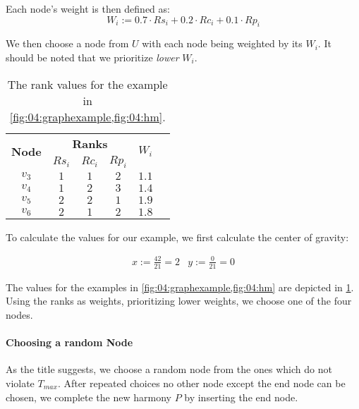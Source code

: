 Each node's weight is then defined as:
\begin{equation*}
	W_i := 0.7 \cdot Rs_i + 0.2 \cdot Rc_i + 0.1 \cdot Rp_i
\end{equation*}

We then choose a node from $U$ with each node being weighted by its $W_i$.
It should be noted that we prioritize \emph{lower} $W_i$.


\begin{table}
	\centering
	\begin{tabular}[c]{|c|c|c|c|c|c|}
		\hline
		\multirow{2}{*}{\textbf{Node}} & \multicolumn{3}{c|}{\textbf{Ranks}} & \multirow{2}{*}{$W_i$}                  \\
		                               & $Rs_i$                              & $Rc_i$                 & $Rp_i$ &       \\\hline
		$v_3$                          & $1$                                 & $1$                    & $2$    & $1.1$ \\\hline
		$v_4$                          & $1$                                 & $2$                    & $3$    & $1.4$ \\\hline
		$v_5$                          & $2$                                 & $2$                    & $1$    & $1.9$ \\\hline
		$v_6$                          & $2$                                 & $1$                    & $2$    & $1.8$ \\\hline
	\end{tabular}
	\caption{The rank values for the example in \cref{fig:04:graphexample,fig:04:hm}.}
	\label{tab:04:ranks}
\end{table}

To calculate the values for our example, we first calculate the center of gravity:

\begin{align*}
	x := \frac{42}{21} = 2 & y := \frac{0}{21} = 0
\end{align*}

The values for the examples in \cref{fig:04:graphexample,fig:04:hm} are depicted in \cref{tab:04:ranks}.
Using the ranks as weights, prioritizing lower weights, we choose one of the four nodes.

\paragraph{Choosing a random Node}

As the title suggests, we choose a random node from the ones which do not violate $T_{max}$.
After repeated choices no other node except the end node can be chosen, we complete the new harmony $P$ by inserting the end node.

